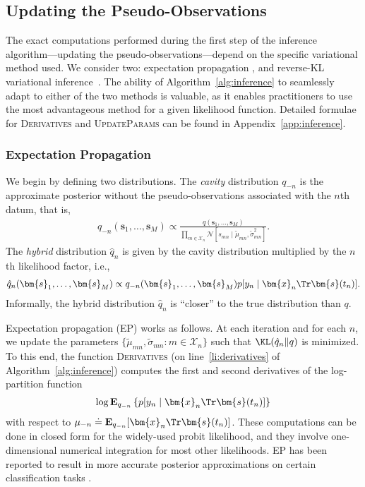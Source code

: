 \subsection{Updating the Pseudo-Observations}
\label{sec:inf-pseudo-obs}

The exact computations performed during the first step of the inference algorithm---updating the pseudo-observations---depend on the specific variational method used.
We consider two: expectation propagation \citep{minka2001family}, and reverse-KL variational inference~\citep{blei2017variational}.
The ability of Algorithm~\ref{alg:inference} to seamlessly adapt to either of the two methods is valuable, as it enables practitioners to use the most advantageous method for a given likelihood function.
Detailed formulae for \textsc{Derivatives} and \textsc{UpdateParams} can be found in Appendix~\ref{app:inference}.

\subsubsection{Expectation Propagation}

We begin by defining two distributions.
The \emph{cavity} distribution $q_{-n}$ is the approximate posterior without the pseudo-observations associated with the $n$th datum, that is,
\begin{align*}
q_{-n}(\bm{s}_1, \ldots, \bm{s}_M) \propto \frac{q(\bm{s}_1, \ldots, \bm{s}_M)}{
        \prod_{m \in \mathcal{X}_n} \mathcal{N}[s_{mn} \mid \tilde{\mu}_{mn}, \tilde{\sigma}^2_{mn}]}.
\end{align*}
The \emph{hybrid} distribution $\hat{q}_n$ is given by the cavity distribution multiplied by the $n$th likelihood factor, i.e.,
\begin{align*}
\hat{q}_n(\bm{s}_1, \ldots, \bm{s}_M) \propto q_{-n}(\bm{s}_1, \ldots, \bm{s}_M) p[y_n \mid \bm{x}_n\Tr \bm{s}(t_n)].
\end{align*}
Informally, the hybrid distribution $\hat{q}_n$ is ``closer'' to the true distribution than $q$.

Expectation propagation (EP) works as follows. At each iteration and for each $n$, we update the parameters $\{ \tilde{\mu}_{mn}, \tilde{\sigma}_{mn} : m \in \mathcal{X}_n \}$ such that $\KL( \hat{q}_n \Vert q )$ is minimized.
To this end, the function \textsc{Derivatives} (on line~\ref{li:derivatives} of Algorithm~\ref{alg:inference}) computes the first and second derivatives of the log-partition function
\begin{align}
\label{eq:logpart}
\log \mathbf{E}_{q_{-n}} \left\{ p[y_n \mid \bm{x}_n\Tr \bm{s}(t_n)] \right\}
\end{align}
with respect to ${\mu}_{-n} \doteq \mathbf{E}_{q_{-n}}[\bm{x}_n\Tr \bm{s}(t_n)]$.
These computations can be done in closed form for the widely-used probit likelihood, and they involve one-dimensional numerical integration for most other likelihoods.
EP has been reported to result in more accurate posterior approximations on certain classification tasks \citep{nickisch2008approximations}.

